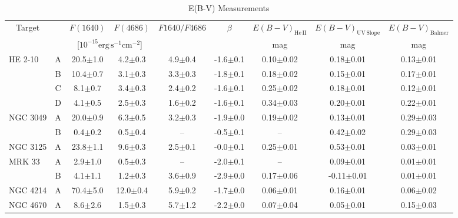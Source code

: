 \begin{table*}[htp]
\begin{center}
\caption{E(B-V) Measurements \label{table:ebv}}
\begin{tabular}{lcccccccc}
\hline\hline
\multicolumn{1}{c}{Target} & \multicolumn{1}{c}{} &
\multicolumn{1}{c}{$F(1640)$} & \multicolumn{1}{c}{$F(4686)$} & \multicolumn{1}{c}{$F1640/F4686$} & 
\multicolumn{1}{c}{$\beta$} & 
\multicolumn{1}{c}{$E(B-V)_{\mathrm{He\,II}}$} &
\multicolumn{1}{c}{$E(B-V)_{\mathrm{UV\,Slope}}$} &
\multicolumn{1}{c}{$E(B-V)_{\mathrm{Balmer}}$} 
\\ 
\multicolumn{1}{c}{} & \multicolumn{1}{c}{} &
\multicolumn{2}{c}{[$10^{-15} \mathrm{erg}\, \mathrm{s}^{-1} \mathrm{ cm}^{-2}$]} & 
\multicolumn{1}{c}{} & 
\multicolumn{1}{c}{} & 
\multicolumn{1}{c}{mag} &
\multicolumn{1}{c}{mag} &
\multicolumn{1}{c}{mag}
\\
\hline
HE 2-10 & A & 20.5$\pm$1.0 & 4.2$\pm$0.3 & 4.9$\pm$0.4 & -1.6$\pm$0.1 & 0.10$\pm$0.02 & 0.18$\pm$0.01 & 0.13$\pm$0.01 \\ 
 & B & 10.4$\pm$0.7 & 3.1$\pm$0.3 & 3.3$\pm$0.3 & -1.8$\pm$0.1 & 0.18$\pm$0.02 & 0.15$\pm$0.01 & 0.17$\pm$0.01 \\ 
 & C & 8.1$\pm$0.7 & 3.4$\pm$0.3 & 2.4$\pm$0.2 & -1.6$\pm$0.1 & 0.25$\pm$0.02 & 0.18$\pm$0.01 & 0.12$\pm$0.01 \\ 
 & D & 4.1$\pm$0.5 & 2.5$\pm$0.3 & 1.6$\pm$0.2 & -1.6$\pm$0.1 & 0.34$\pm$0.03 & 0.20$\pm$0.01 & 0.22$\pm$0.01 \\ 
NGC 3049 & A & 20.0$\pm$0.9 & 6.3$\pm$0.5 & 3.2$\pm$0.3 & -1.9$\pm$0.0 & 0.19$\pm$0.02 & 0.13$\pm$0.01 & 0.29$\pm$0.03 \\ 
 & B & 0.4$\pm$0.2 & 0.5$\pm$0.4 & -- & -0.5$\pm$0.1 & -- & 0.42$\pm$0.02 & 0.29$\pm$0.03 \\ 
NGC 3125 & A & 23.8$\pm$1.1 & 9.6$\pm$0.3 & 2.5$\pm$0.1 & -0.0$\pm$0.1 & 0.25$\pm$0.01 & 0.53$\pm$0.01 & 0.03$\pm$0.01 \\ 
MRK 33 & A & 2.9$\pm$1.0 & 0.5$\pm$0.3 & -- & -2.0$\pm$0.1 & -- & 0.09$\pm$0.01 & 0.01$\pm$0.01 \\ 
 & B & 4.1$\pm$1.1 & 1.2$\pm$0.3 & 3.6$\pm$0.9 & -2.9$\pm$0.0 & 0.17$\pm$0.06 & -0.11$\pm$0.01 & 0.01$\pm$0.01 \\ 
NGC 4214 & A & 70.4$\pm$5.0 & 12.0$\pm$0.4 & 5.9$\pm$0.2 & -1.7$\pm$0.0 & 0.06$\pm$0.01 & 0.16$\pm$0.01 & 0.06$\pm$0.02 \\ 
NGC 4670 & A & 8.6$\pm$2.6 & 1.5$\pm$0.3 & 5.7$\pm$1.2 & -2.2$\pm$0.0 & 0.07$\pm$0.04 & 0.05$\pm$0.01 & 0.15$\pm$0.03 \\ 

\end{tabular}
\end{center}
\end{table*}
